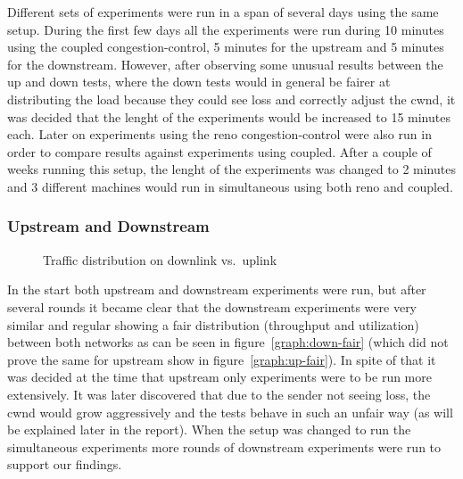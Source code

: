 \documentclass[12pt,a4paper]{article}
\begin{document}
Different sets of experiments were run in a span of several days using the same
setup. During the first few days all the experiments were run during 10 minutes
using the coupled congestion-control, 5 minutes for the upstream and 5 minutes
for the downstream. However, after observing some unusual results between the up
and down tests, where the down tests would in general be fairer at distributing
the load because they could see loss and correctly adjust the cwnd, it was
decided that the lenght of the experiments would be increased to 15 minutes
each. Later on experiments using the reno congestion-control were also run in
order to compare results against experiments using coupled. After a couple of
weeks running this setup, the lenght of the experiments was changed to 2 minutes
and 3 different machines would run in simultaneous using both reno and coupled.


\subsubsection{Upstream and Downstream}

\begin{figure}[h]
 \centering
 \subfloat[][downlink] {\
   \scalebox{0.55}{}\label{graph:down-fair}
 }
 \subfloat[][uplink] {\
   \scalebox{0.55}{}\label{graph:up-fair}
 }

 \caption{Traffic distribution on downlink vs.\ uplink}\label{graph:interference}
\end{figure}

In the start both upstream and downstream experiments were run, but after
several rounds it became clear that the downstream experiments were very similar
and regular showing a fair distribution (throughput and utilization) between
both networks as can be seen in figure~\ref{graph:down-fair} (which did not
prove the same for upstream show in figure~\ref{graph:up-fair}). In spite of
that it was decided at the time that upstream only experiments were to be run
more extensively. It was later discovered that due to the sender not seeing
loss, the cwnd would grow aggressively and the tests behave in such an unfair
way (as will be explained later in the report). When the setup was changed to
run the simultaneous experiments more rounds of downstream experiments were run
to support our findings.
\end{document}

